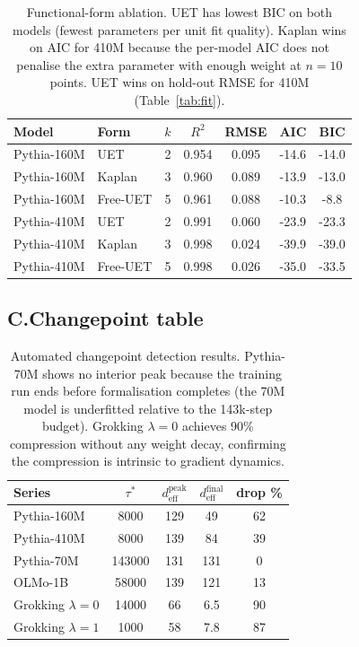 \documentclass[10pt]{article}
\theoremstyle{plain}
\theoremstyle{definition}
\theoremstyle{remark}
\begin{document}
\begin{table}[H]
\centering\small
\begin{tabular}{llSSSSS}
\toprule
Model & Form & {$k$} & {$R^2$} & {RMSE} & {AIC} & {BIC} \\
\midrule
Pythia-160M & UET         & 2 & 0.954 & 0.095 & -14.6 & -14.0 \\
Pythia-160M & Kaplan      & 3 & 0.960 & 0.089 & -13.9 & -13.0 \\
Pythia-160M & Free-UET    & 5 & 0.961 & 0.088 & -10.3 & -8.8 \\
\midrule
Pythia-410M & UET         & 2 & 0.991 & 0.060 & -23.9 & -23.3 \\
Pythia-410M & Kaplan      & 3 & 0.998 & 0.024 & -39.9 & -39.0 \\
Pythia-410M & Free-UET    & 5 & 0.998 & 0.026 & -35.0 & -33.5 \\
\bottomrule
\end{tabular}
\caption{Functional-form ablation. UET has lowest BIC on both models (fewest
parameters per unit fit quality). Kaplan wins on AIC for 410M because the
per-model AIC does not penalise the extra parameter with enough weight at
$n=10$ points. UET wins on hold-out RMSE for 410M
(Table~\ref{tab:fit}).}
\label{tab:ablation}
\end{table}

\subsection*{C.\enspace Changepoint table}

\begin{table}[H]
\centering\small
\begin{tabular}{lSSSS}
\toprule
Series & {$\tau^*$} & {$d_{\mathrm{eff}}^{\mathrm{peak}}$} &
         {$d_{\mathrm{eff}}^{\mathrm{final}}$} & {drop \%} \\
\midrule
Pythia-160M        & 8000   & 129 & 49  & 62 \\
Pythia-410M        & 8000   & 139 & 84  & 39 \\
Pythia-70M         & 143000 & 131 & 131 & 0  \\
OLMo-1B            & 58000  & 139 & 121 & 13 \\
Grokking $\lambda=0$ & 14000 & 66  & 6.5 & 90 \\
Grokking $\lambda=1$ & 1000  & 58  & 7.8 & 87 \\
\bottomrule
\end{tabular}
\caption{Automated changepoint detection results. Pythia-70M shows no interior
peak because the training run ends before formalisation completes (the
70M model is underfitted relative to the 143k-step budget).
Grokking $\lambda=0$ achieves 90\% compression without any weight decay,
confirming the compression is intrinsic to gradient dynamics.}
\label{tab:cp}
\end{table}
\end{document}
